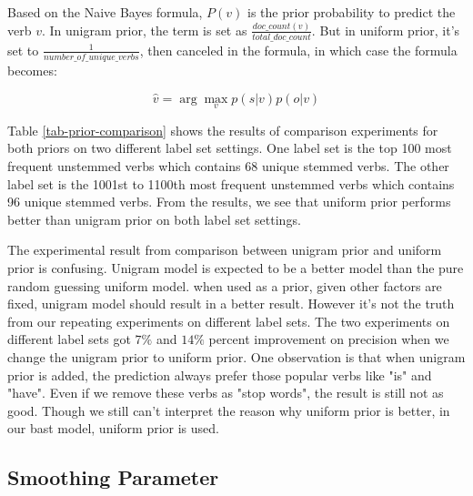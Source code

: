 Based on the Naive Bayes formula, $P(v)$ is the prior probability to predict the verb $v$. In unigram prior, the term is set as $\frac{doc\_count(v)}{total\_doc\_count}$. But in uniform prior, it's set to $\frac{1}{number\_of\_unique\_verbs}$, then canceled in the formula, in which case the formula becomes:

\begin{equation}
	\hat{v} = \arg\max_v p(s|v)p(o|v)
\end{equation}

Table \ref{tab-prior-comparison} shows the results of comparison experiments for both priors on two different label set settings. One label set is the top 100 most frequent unstemmed verbs which contains 68 unique stemmed verbs. The other label set is the 1001st to 1100th most frequent unstemmed verbs which contains 96 unique stemmed verbs. From the results, we see that uniform prior performs better than unigram prior on both label set settings. 

The experimental result from comparison between unigram prior and uniform prior is confusing. Unigram model is expected to be a better model than the pure random guessing uniform model. when used as a prior, given other factors are fixed, unigram model should result in a better result. However it's not the truth from our repeating experiments on different label sets. The two experiments on different label sets got $7\%$ and $14\%$ percent improvement on precision when we change the unigram prior to uniform prior. One observation is that when unigram prior is added, the prediction always prefer those popular verbs like "is" and "have". Even if we remove these verbs as "stop words", the result is still not as good. Though we still can't interpret the reason why uniform prior is better, in our bast model, uniform prior is used. \cite{peng2004augmenting}

\subsection{Smoothing Parameter}

